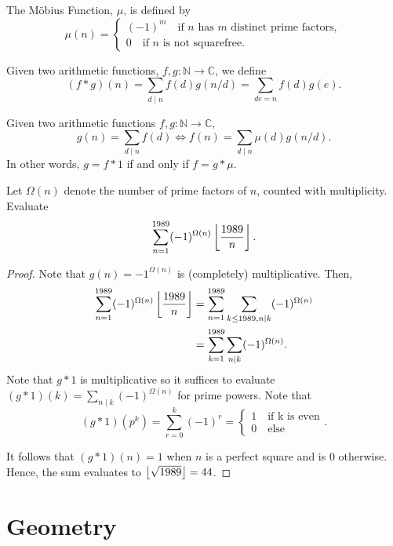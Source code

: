 \documentclass[11pt]{article}
\newcommand{\N}{\mathbb{N}}
\newcommand{\C}{\mathbb C}
\renewcommand{\>}{\rangle}
\newcommand{\<}{\langle}
\begin{document}
\begin{definition} The Möbius Function, $\mu$, is defined by 
$$\mu(n) = \begin{cases}
(-1)^m \quad \text{if }n \text{ has }m \text{ distinct prime factors}, \\
0 \quad \text{if }n \text{ is not squarefree}.
\end{cases}$$
\end{definition}

\begin{definition} Given two arithmetic functions, $f, g: \N \to \C$, we define 
$$(f * g)(n) = \sum_{d \mid n} f(d) g(n/d) = \sum_{de = n} f(d) g(e).$$
\end{definition}

\begin{theorem} Given two arithmetic functions $f, g: \N \to \C$, 
$$g(n) = \sum_{d \mid n} f(d) \Longleftrightarrow f(n) = \sum_{d  \mid n} \mu(d) g(n/d).$$
In other words, $g = f * 1$ if and only if $f = g * \mu$.
\end{theorem}

\begin{problem}[Bulgaria 1989] Let $\Omega(n)$ denote the number of prime factors of $n$, counted with multiplicity.  Evaluate 
$$\sum_{n=1}^{1989} (-1)^{\Omega(n)} \left\lfloor \frac{1989}{n} \right\rfloor.$$
\end{problem}
\begin{proof}
Note that $g(n) = -1^{\Omega(n)}$ is (completely) multiplicative.  Then,
\begin{align*}
\sum_{n=1}^{1989} (-1)^{\Omega(n)} \left\lfloor \frac{1989}{n} \right\rfloor &= \sum_{n=1}^{1989} \sum_{k \le 1989, n \mid k}  (-1)^{\Omega(n)} \\
&= \sum_{k=1}^{1989} \sum_{n \mid k} (-1)^{\Omega(n)}.
\end{align*}
Note that $g * 1$ is multiplicative so it suffices to evaluate $(g * 1)(k) = \sum_{n \mid k} (-1)^{\Omega(n)}$ for prime powers.  Note that 
$$(g*1)(p^k) = \sum_{r=0}^k (-1)^{r} = \begin{cases}
1 \quad \text{if k is even}\\
0 \quad \text{else}
\end{cases}.$$

It follows that $(g*1)(n) = 1$ when $n$ is a perfect square and is $0$ otherwise.  Hence, the sum evaluates to $\left\lfloor \sqrt{1989} \right\rfloor = 44$.
\end{proof} 
\pagebreak
\section{Geometry}
\end{document}
